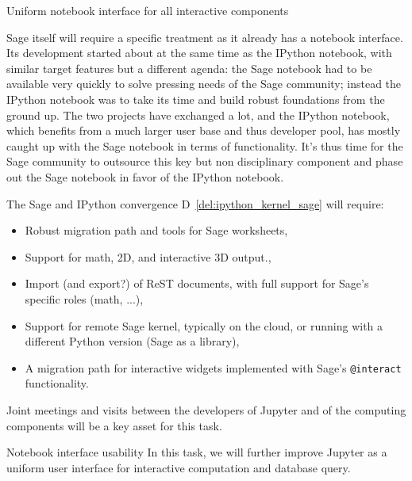 \begin{Workpackage}{\thewpno}
\begin{task}{Uniform notebook interface for all interactive components}

  Sage itself will require a specific treatment as it already has a
  notebook interface. Its development started about at the same time
  as the IPython notebook, with similar target features but a
  different agenda: the Sage notebook had to be available very quickly
  to solve pressing needs of the Sage community; instead the IPython
  notebook was to take its time and build robust foundations from the
  ground up. The two projects have exchanged a lot, and the IPython
  notebook, which benefits from a much larger user base and thus
  developer pool, has mostly caught up with the Sage notebook in terms
  of functionality. It's thus time for the Sage community to outsource
  this key but non disciplinary component and phase out the Sage
  notebook in favor of the IPython notebook.

  The Sage and IPython convergence D~\ref{del:ipython_kernel_sage} will
  require:
  \begin{itemize}
  \item Robust migration path and tools for Sage worksheets,
  \item Support for math, 2D, and interactive 3D output.,
  \item Import (and export?) of ReST documents, with full support for
    Sage's specific roles (math, ...),
  \item Support for remote Sage kernel, typically on the cloud, or
    running with a different Python version (Sage as a library),
  \item A migration path for interactive widgets implemented with
    Sage's \texttt{@interact} functionality.
  \end{itemize}

  Joint meetings and visits between the developers of Jupyter and of
  the computing components will be a key asset for this task.

\end{task}

\begin{task}{Notebook interface usability}
  In this task, we will further improve Jupyter as a uniform user
  interface for interactive computation and database query.


\end{task}
\end{Workpackage}
